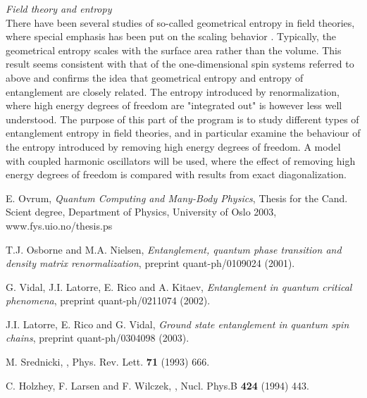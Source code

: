 \noindent
{\em Field theory and entropy}\\
There have been several studies of so-called geometrical entropy in field
theories, where special emphasis has been put on the scaling behavior
\cite{Srednicki, Holzhey}. Typically, the geometrical entropy scales with the
surface area rather than the volume. This result seems consistent
with that of the
one-dimensional spin systems referred to above and confirms the idea that
geometrical entropy and entropy of entanglement are closely related.
The entropy
introduced by renormalization, where high energy degrees of freedom are
"integrated out" is however less well understood. The purpose of this
part of the
program is to study different types of entanglement entropy in field
theories, and
in particular examine the behaviour of the entropy introduced by removing high
energy degrees of freedom. A model with coupled harmonic oscillators
will be used,
where the effect of removing high energy degrees of freedom is compared with
results from exact diagonalization.


\begin{thebibliography}{99}


 E. Ovrum, {\em Quantum Computing and Many-Body
Physics}, Thesis
for the Cand. Scient degree, Department of Physics, University of Oslo 2003,
www.fys.uio.no/thesis.ps

T.J. Osborne and M.A. Nielsen, {\em Entanglement, quantum phase transition and
density matrix renormalization}, preprint quant-ph/0109024 (2001).

G. Vidal, J.I. Latorre, E. Rico and A. Kitaev, {\em Entanglement in quantum
critical phenomena}, preprint quant-ph/0211074 (2002).

J.I. Latorre, E. Rico and G. Vidal, {\em Ground state entanglement in quantum
spin chains}, preprint quant-ph/0304098 (2003).

M. Srednicki, {\em }, Phys. Rev. Lett. {\bf 71} (1993) 666.

C. Holzhey, F. Larsen and F. Wilczek, {\em }, Nucl. Phys.B {\bf 424}
(1994) 443.


\end{thebibliography}


